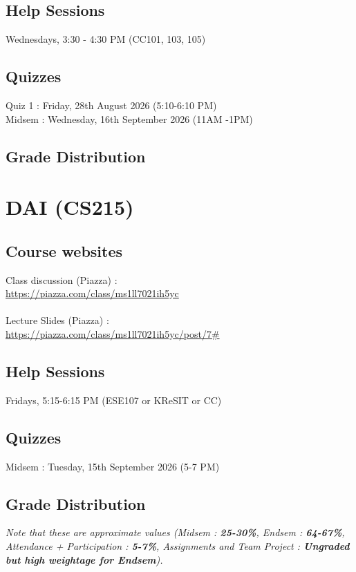 \documentclass{article}
\begin{document}
    \subsection{Help Sessions}
   Wednesdays, 3:30 - 4:30 PM (CC101, 103, 105)

    \subsection{Quizzes}
        Quiz 1 : Friday, 28th August 2026 (5:10-6:10 PM)\\
        Midsem : Wednesday, 16th September 2026 (11AM -1PM)
    \subsection{Grade Distribution}

\pagebreak


\section{DAI (CS215)}

    \subsection{Course websites}
    Class discussion (Piazza) : \\\url{https://piazza.com/class/ms1ll7021ih5yc}
    \\\\Lecture Slides (Piazza) : \\\url{https://piazza.com/class/ms1ll7021ih5yc/post/7#}

    \subsection{Help Sessions}
    Fridays, 5:15-6:15 PM (ESE107 or KReSIT or CC)

    \subsection{Quizzes}
        Midsem : Tuesday, 15th September 2026 (5-7 PM)
    \subsection{Grade Distribution}
\textit{Note that these are approximate values (Midsem : \textbf{25-30\%}, Endsem : \textbf{64-67\%}, Attendance + Participation : \textbf{5-7\%}, Assignments and Team Project : \textbf{Ungraded but high weightage for Endsem}).}\\\\
\end{document}
